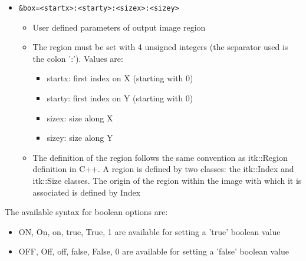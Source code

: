 \begin{itemize}
\item \begin{verbatim}&box=<startx>:<starty>:<sizex>:<sizey>\end{verbatim}
\begin{itemize}
    \item User defined parameters of output image region
    \item The region must be set with 4 unsigned integers (the separator used is
      the colon ':'). Values are:
      \begin{itemize}
        \item startx: first index on X (starting with 0)
        \item starty: first index on Y (starting with 0)
        \item sizex: size along X
        \item sizey: size along Y 
      \end{itemize}
    \item The definition of the region follows the same convention as itk::Region
    definition in C++. A region is defined by two classes: the itk::Index and
    itk::Size classes. The origin of the region within the image with which it
    is associated is defined by Index 
\end{itemize}

\end{itemize}

The available syntax for boolean options are:

\begin{itemize}
    \item ON, On, on, true, True, 1 are available for setting a 'true' boolean value
    \item OFF, Off, off, false, False, 0 are available for setting a 'false' boolean value
\end{itemize}


